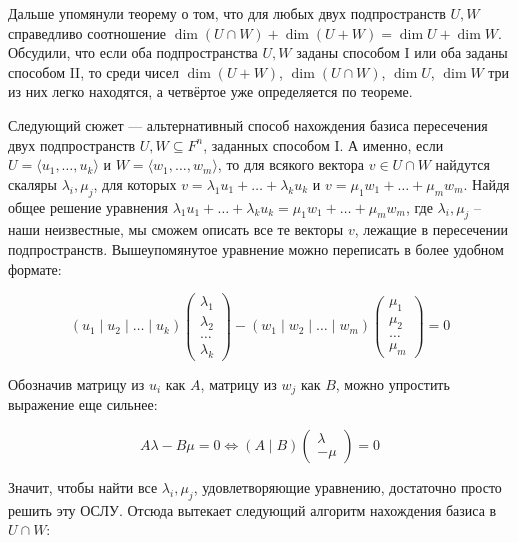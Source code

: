\documentclass[10pt, a4paper]{extarticle}
\theoremstyle{definition}
\begin{document}
Дальше упомянули теорему о том, что для любых двух подпространств $U,W$ справедливо соотношение $\dim (U \cap W) + \dim (U + W) = \dim U + \dim W$.
Обсудили, что если оба подпространства $U,W$ заданы способом I или оба заданы способом II, то среди чисел $\dim (U + W)$, $\dim (U \cap W)$, $\dim U$, $\dim W$ 
три из них легко находятся, а четвёртое уже определяется по теореме.

Следующий сюжет --- альтернативный способ нахождения базиса пересечения двух подпространств $U,W \subseteq F^n$, заданных способом I.
А именно, если $U = \langle u_1,\dots, u_k \rangle$ и $W = \langle w_1,\dots, w_m \rangle$, то для всякого вектора $v \in U \cap W$ найдутся скаляры $\lambda_i, \mu_j$,
для которых $v = \lambda_1u_1+ \dots + \lambda_k u_k$ и $v = \mu_1w_1+ \dots + \mu_m w_m$. Найдя общее решение уравнения $\lambda_1u_1 + \dots + \lambda_k u_k = \mu_1w_1 + \dots + \mu_m w_m$,
где $\lambda_i, \mu_j$ -- наши неизвестные, мы сможем описать все те векторы $v$, лежащие в пересечении подпространств. Вышеупомянутое уравнение можно переписать в более удобном формате:

\[
    (u_1 \mid u_2 \mid \dots \mid u_k) \begin{pmatrix}
        \lambda_1 \\ \lambda_2 \\ \dots \\ \lambda_k
    \end{pmatrix} - 
    (w_1 \mid w_2 \mid \dots \mid w_m) \begin{pmatrix}
        \mu_1 \\ \mu_2 \\ \dots \\ \mu_m
    \end{pmatrix} = 0
\]

Обозначив матрицу из $u_i$ как $A$, матрицу из $w_j$ как $B$, можно упростить выражение еще сильнее:

\[
    A \lambda - B \mu = 0 \iff (A \mid B) \begin{pmatrix}
        \lambda \\ -\mu
    \end{pmatrix} = 0
\]

Значит, чтобы найти все $\lambda_i, \mu_j$, удовлетворяющие уравнению, достаточно просто решить эту ОСЛУ.
Отсюда вытекает следующий алгоритм нахождения базиса в $U \cap W$:
\end{document}
